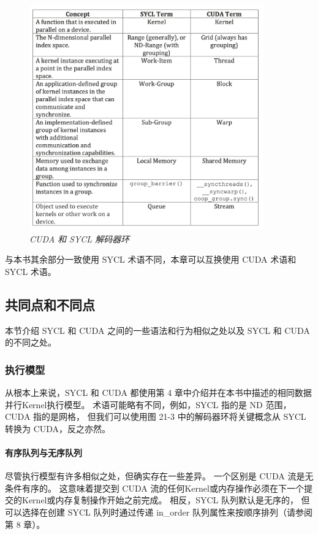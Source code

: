 \begin{figure}[H]
	\centering
	\includegraphics[width=0.9\textwidth]{figs/F21.3.png}
	\caption{\textit{CUDA 和 SYCL 解码器环 }}
\end{figure}

与本书其余部分一致使用 SYCL 术语不同，本章可以互换使用 CUDA 术语和 SYCL 术语。

\subsection{共同点和不同点}
本节介绍 SYCL 和 CUDA 之间的一些语法和行为相似之处以及 SYCL 和 CUDA 的不同之处。

\subsubsection{执行模型}
从根本上来说，SYCL 和 CUDA 都使用第 4 章中介绍并在本书中描述的相同数据并行Kernel执行模型。 
术语可能略有不同，例如，SYCL 指的是 ND 范围，CUDA 指的是网格，
但我们可以使用图 21-3 中的解码器环将关键概念从 SYCL 转换为 CUDA，反之亦然。

\paragraph{有序队列与无序队列}

尽管执行模型有许多相似之处，但确实存在一些差异。 一个区别是 CUDA 流是无条件有序的。 
这意味着提交到 CUDA 流的任何Kernel或内存操作必须在下一个提交的Kernel或内存复制操作开始之前完成。 
相反，SYCL 队列默认是无序的，
但可以选择在创建 SYCL 队列时通过传递 in\_order 队列属性来按顺序排列（请参阅第 8 章）。

